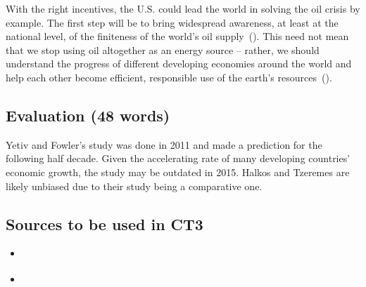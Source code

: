 \documentclass[12pt,letterpaper]{article}
\renewcommand{\citep}[1]{(\cite{#1})}
\begin{document}
With the right incentives, the U.S. could lead the world in solving the oil
crisis by example. The first step will be to bring widespread awareness, at
least at the national level, of the finiteness of the world's oil
supply~\citep{yetiv2011}. This need not mean that we stop using oil altogether
as an energy source -- rather, we should understand the progress of different
developing economies around the world and help each other become efficient,
responsible use of the earth's resources~\citep{halkos2011}.

\subsection*{Evaluation (48 words)}

Yetiv and Fowler's study was done in 2011 and made a prediction for the
following half decade. Given the accelerating rate of many developing
countries' economic growth, the study may be outdated in 2015. Halkos and
Tzeremes are likely unbiased due to their study being a comparative one.

\subsection*{Sources to be used in CT3}

\begin{itemize}
  \item \cite{park2014}
  \item \cite{gately2012}
\end{itemize}



\end{document}
